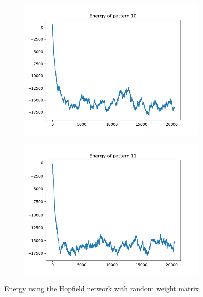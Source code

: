 \documentclass[a4paper]{article}
\begin{document}
\begin{figure}[ht]
   \begin{subfigure}[b]{0.5\textwidth}
   \centering
   \includegraphics[width=\linewidth]{figures/ep10r.png}
   \end{subfigure}
  \begin{subfigure}[b]{0.5\textwidth}
   \centering
   \includegraphics[width=\linewidth]{figures/ep11r.png}
   \end{subfigure}
   \caption{Energy using the Hopfield network with random weight matrix}
   \label{fig:energyrandom}
\end{figure}
\end{document}
